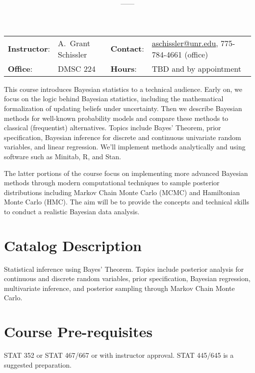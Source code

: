 \documentclass[11pt,onecolumn]{article}
\title{\textbf{\coursename}}
\author{{\semester}---{\roomnumb}---{\classtimes}}
\date{}
\makeatletter
\newcommand{\myname}{A.~Grant Schissler}
\newcommand{\myemail}{aschissler@unr.edu}
\newcommand{\office}{DMSC 224}
\newcommand{\officehours}{TBD and by appointment}
\makeatother
\begin{document}
\maketitle

\vspace{-0.25in}
\noindent\makebox[\linewidth]{\rule{\textwidth}{1pt}}

\begin{center}
\begin{tabular}{llll}
\textbf{Instructor}:&\myname & \textbf{Contact}:&\href{mailto:\myemail}{\myemail}, 775-784-4661 (office)\\
\textbf{Office}:&\office & \textbf{Hours}:&\officehours\\
\end{tabular}
\end{center}

\noindent This course introduces Bayesian statistics to a technical audience. Early on, we focus on the logic behind Bayesian statistics, including the mathematical formalization of updating beliefs under uncertainty. Then we describe Bayesian methods for well-known probability models and compare these methods to classical (frequentist) alternatives. Topics include Bayes' Theorem, prior specification, Bayesian inference for discrete and continuous univariate random variables, and linear regression. We'll implement methods analytically and using software such as Minitab, R, and Stan.

The latter portions of the course focus on implementing more advanced Bayesian methods through modern computational techniques to sample posterior distributions including Markov Chain Monte Carlo (MCMC) and Hamiltonian Monte Carlo (HMC). The aim will be to provide the concepts and technical skills to conduct a realistic Bayesian data analysis. 

\section*{Catalog Description}
Statistical inference using Bayes' Theorem. Topics include posterior analysis for continuous and discrete random variables, prior specification, Bayesian regression, multivariate inference, and posterior sampling through Markov Chain Monte Carlo.

\section*{Course Pre-requisites}
STAT 352 or STAT 467/667 or with instructor approval. STAT 445/645 is a suggested preparation.
\end{document}
